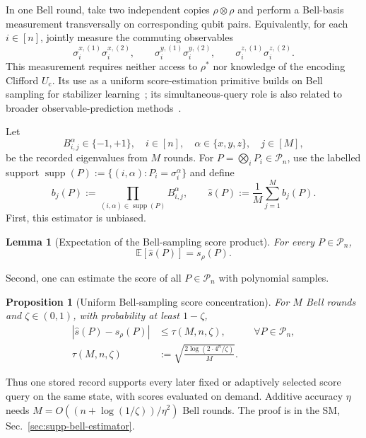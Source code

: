\documentclass[
  aps,
  prx,
  reprint,
  superscriptaddress,
  amsmath,
  amssymb,
  nofootinbib,
  longbibliography
]{revtex4-2}
\newtheorem{proposition}[theorem]{Proposition}
\newtheorem{lemma}[theorem]{Lemma}
\newcommand{\supp}{\operatorname{supp}}
\newcommand{\Pc}{\mathcal{P}}
\begin{document}
In one Bell round, take two independent copies $\rho\otimes\rho$ and perform a
Bell-basis measurement transversally on corresponding qubit pairs.  Equivalently,
for each $i\in[n]$, jointly measure the commuting observables
\begin{equation}
\sigma_i^{x,(1)}\sigma_i^{x,(2)},\qquad
\sigma_i^{y,(1)}\sigma_i^{y,(2)},\qquad
\sigma_i^{z,(1)}\sigma_i^{z,(2)}.
\end{equation}
This measurement requires neither access to $\rho^*$ nor knowledge of the
encoding Clifford $U_{\mathrm c}$.  Its use as a uniform score-estimation primitive
builds on Bell sampling for stabilizer learning~\cite{Montanaro2017}; its
simultaneous-query role is also related to broader observable-prediction
methods~\cite{HuangKuengPreskill2021}.

Let
\begin{equation}
B_{i,j}^{\alpha}\in\{-1,+1\},
\quad
i\in[n],\quad \alpha\in\{x,y,z\},\quad j\in[M],
\end{equation}
be the recorded eigenvalues from $M$ rounds.  For
$P=\bigotimes_iP_i\in\Pc_n$, use the labelled support
$\supp(P):=\{(i,\alpha):P_i=\sigma_i^\alpha\}$ and define
\begin{equation}
b_j(P)
:=
\prod_{(i,\alpha)\in\supp(P)}B_{i,j}^{\alpha},
\qquad
\hat s(P)
:=
\frac1M\sum_{j=1}^M b_j(P).
\end{equation}
First, this estimator is unbiased. 
\begin{lemma}[Expectation of the Bell-sampling score product]
\label{lem:main-bell-product-expectation}
For every $P\in\Pc_n$,
\begin{equation}
\mathbb E[\hat s(P)]=s_\rho(P).
\end{equation}
\end{lemma}
\noindent Second, one can estimate the score of all $P\in\Pc_n$ with polynomial samples. 
\begin{proposition}[Uniform Bell-sampling score concentration]
\label{prop:main-uniform-bell-score-concentration}
For $M$ Bell rounds and $\zeta\in(0,1)$, with probability at least
$1-\zeta$,
\begin{equation}
\begin{aligned}
\left|\hat s(P)-s_\rho(P)\right|
&\le\tau(M,n,\zeta),
&&\forall P\in\Pc_n,\\
\tau(M,n,\zeta)
&:=\sqrt{\frac{2\log(2\cdot4^n/\zeta)}{M}}.
\end{aligned}
\label{eq:main-bell-uniform-guarantee}
\end{equation}
\end{proposition}
Thus one stored record supports every later fixed or adaptively selected
score query on the same state, with scores evaluated on demand.
Additive accuracy $\eta$ needs
$M=O((n+\log(1/\zeta))/\eta^2)$ Bell rounds.  The proof is in the SM,
Sec.~\ref{sec:supp-bell-estimator}.
\end{document}
